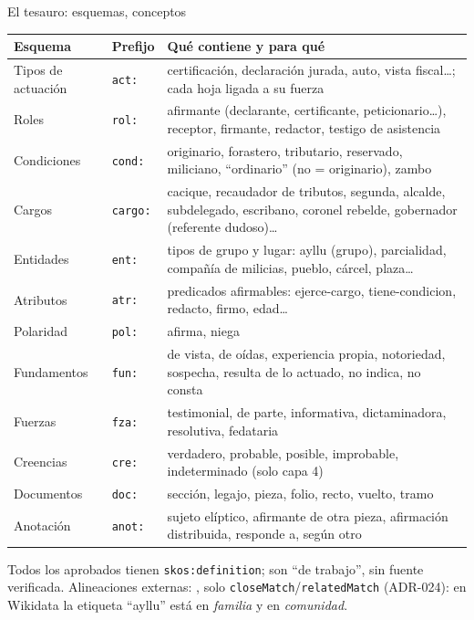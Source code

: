 \documentclass[aspectratio=169,10pt]{beamer}
\newcommand{\ttt}[1]{\texttt{\small #1}}
\begin{document}
\begin{frame}[shrink=15]{El tesauro: \cifraEsquemas{} esquemas, \cifraConceptos{} conceptos}
\scriptsize
\begin{tabular}{@{}p{2.7cm}p{1.2cm}p{9.2cm}@{}}
\toprule
Esquema & Prefijo & Qué contiene y para qué \\
\midrule
Tipos de actuación & \ttt{act:} & certificación, declaración jurada, auto, vista fiscal…; cada hoja ligada a su fuerza \\
Roles & \ttt{rol:} & afirmante (declarante, certificante, peticionario…), receptor, firmante, redactor, testigo de asistencia \\
Condiciones & \ttt{cond:} & originario, forastero, tributario, reservado, miliciano, \enquote{ordinario} (\alert{no} = originario), zambo \\
Cargos & \ttt{cargo:} & cacique, recaudador de tributos, segunda, alcalde, subdelegado, escribano, coronel rebelde, gobernador (referente dudoso)… \\
Entidades & \ttt{ent:} & tipos de grupo y lugar: ayllu (grupo), parcialidad, compañía de milicias, pueblo, cárcel, plaza… \\
Atributos & \ttt{atr:} & \cifraAtributos{} predicados afirmables: ejerce-cargo, tiene-condicion, redacto, firmo, edad… \\
Polaridad & \ttt{pol:} & afirma, niega \\
Fundamentos & \ttt{fun:} & de vista, de oídas, experiencia propia, notoriedad, sospecha, resulta de lo actuado, no indica, no consta \\
Fuerzas & \ttt{fza:} & testimonial, de parte, informativa, dictaminadora, resolutiva, fedataria \\
Creencias & \ttt{cre:} & verdadero, probable, posible, improbable, indeterminado (solo capa 4) \\
Documentos & \ttt{doc:} & sección, legajo, pieza, folio, recto, vuelto, tramo \\
Anotación & \ttt{anot:} & sujeto elíptico, afirmante de otra pieza, afirmación distribuida, responde a, según otro \\
\bottomrule
\end{tabular}

\medskip
\footnotesize Todos los aprobados tienen \ttt{skos:definition}; \cifraDefinicionesDeTrabajo{} son \enquote{de trabajo},
sin fuente verificada. Alineaciones externas: \cifraAlineaciones, solo \ttt{closeMatch}/\ttt{relatedMatch} (ADR-024):
en Wikidata la etiqueta \enquote{ayllu} está en \emph{familia} y en \emph{comunidad}.
\end{frame}
\end{document}
